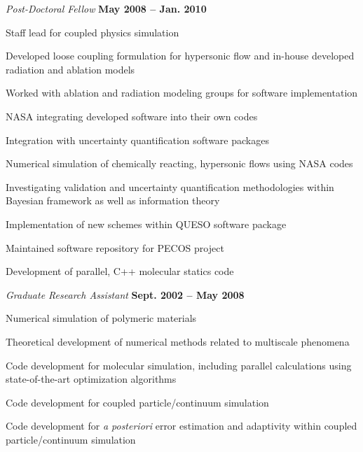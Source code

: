 \documentclass[12pt]{article}
\newenvironment{outerlist}[1][\enskip\textbullet]%
        {\begin{enumerate}[#1]}{\end{enumerate}%
         \vspace{-.6\baselineskip}}
\newenvironment{innerlist}[1][\enskip\textbullet]%
        {\begin{compactenum}[#1]}{\end{compactenum}}
\newcommand{\blankline}{\quad\pagebreak[2]}
\begin{document}
\begin{outerlist}
\item[] \textit{Post-Doctoral Fellow}%
        \hfill \textbf{May 2008 -- Jan. 2010}
\begin{innerlist}
\item Staff lead for coupled physics simulation
	\begin{innerlist}
	\item Developed loose coupling formulation for hypersonic flow and in-house developed radiation
		and ablation models
	\item Worked with ablation and radiation modeling groups for software implementation
	\item NASA integrating developed software into their own codes
	\item Integration with uncertainty quantification software packages 
	\end{innerlist}
\item Numerical simulation of chemically reacting, hypersonic flows using NASA codes
\item Investigating validation and uncertainty quantification methodologies within Bayesian framework as 
well as information theory
\item Implementation of new schemes within QUESO software package
\item Maintained software repository for PECOS project
\item Development of parallel, C++ molecular statics code
\end{innerlist}
\end{outerlist}

\blankline

\begin{outerlist}
\item[] \textit{Graduate Research Assistant}%
        \hfill \textbf{Sept. 2002 -- May 2008}
\begin{innerlist}
\item Numerical simulation of polymeric materials
\item Theoretical development of numerical methods related to multiscale phenomena
\item Code development for molecular simulation, including parallel calculations using state-of-the-art
optimization algorithms
\item Code development for coupled particle/continuum simulation
\item Code development for \emph{a posteriori} error estimation and adaptivity within coupled
particle/continuum simulation
\end{innerlist}
\end{outerlist}
\end{document}
